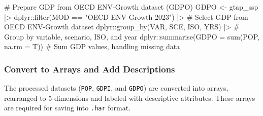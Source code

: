 \documentclass[
  letterpaper,
  DIV=11,
  numbers=noendperiod]{scrartcl}
\newenvironment{Shaded}{}{}
\newcommand{\AttributeTok}[1]{\textcolor[rgb]{0.00,0.34,0.68}{#1}}
\newcommand{\CommentTok}[1]{\textcolor[rgb]{0.54,0.53,0.53}{#1}}
\newcommand{\FunctionTok}[1]{\textcolor[rgb]{0.39,0.29,0.61}{#1}}
\newcommand{\NormalTok}[1]{\textcolor[rgb]{0.12,0.11,0.11}{#1}}
\newcommand{\OtherTok}[1]{\textcolor[rgb]{0.00,0.43,0.16}{#1}}
\newcommand{\SpecialCharTok}[1]{\textcolor[rgb]{0.24,0.68,0.91}{#1}}
\newcommand{\StringTok}[1]{\textcolor[rgb]{0.75,0.01,0.01}{#1}}
\begin{document}
\begin{Shaded}
\begin{Highlighting}[]
\CommentTok{\# Prepare GDP from OECD ENV{-}Growth dataset (GDPO)}
\NormalTok{GDPO }\OtherTok{\textless{}{-}}\NormalTok{ gtap\_ssp }\SpecialCharTok{|\textgreater{}}
\NormalTok{  dplyr}\SpecialCharTok{::}\FunctionTok{filter}\NormalTok{(MOD }\SpecialCharTok{==} \StringTok{"OECD ENV{-}Growth 2023"}\NormalTok{) }\SpecialCharTok{|\textgreater{}}                  \CommentTok{\# Select GDP from OECD ENV{-}Growth dataset}
\NormalTok{  dplyr}\SpecialCharTok{::}\FunctionTok{group\_by}\NormalTok{(VAR, SCE, ISO, YRS) }\SpecialCharTok{|\textgreater{}}                           \CommentTok{\# Group by variable, scenario, ISO, and year}
\NormalTok{  dplyr}\SpecialCharTok{::}\FunctionTok{summarise}\NormalTok{(}\AttributeTok{GDPO =} \FunctionTok{sum}\NormalTok{(POP, }\AttributeTok{na.rm =}\NormalTok{ T))                     }\CommentTok{\# Sum GDP values, handling missing data}
\end{Highlighting}
\end{Shaded}

\subsubsection{Convert to Arrays and Add
Descriptions}\label{convert-to-arrays-and-add-descriptions}

The processed datasets (\texttt{POP}, \texttt{GDPI}, and \texttt{GDPO})
are converted into arrays, rearranged to 5 dimensions and labeled with
descriptive attributes. These arrays are required for saving into
\texttt{.har} format.
\end{document}
